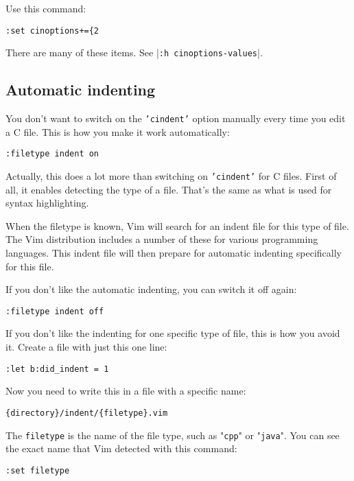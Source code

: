 {{Use this command:

\begin{Verbatim}[samepage=true]
 :set cinoptions+={2
\end{Verbatim}

There are many of these items.  See |\texttt{:h cinoptions-values}|.
\subsection{Automatic indenting}
You don't want to switch on the \texttt{'cindent'} option manually every time you edit a C file.
This is how you make it work automatically:

\begin{Verbatim}[samepage=true]
 :filetype indent on
\end{Verbatim}

Actually, this does a lot more than switching on \texttt{'cindent'} for C files.
First of all, it enables detecting the type of a file.
That's the same as what is used for syntax highlighting.

When the filetype is known, Vim will search for an indent file for this type of file.
The Vim distribution includes a number of these for various programming languages.
This indent file will then prepare for automatic indenting specifically for this file.

If you don't like the automatic indenting, you can switch it off again:

\begin{Verbatim}[samepage=true]
 :filetype indent off
\end{Verbatim}

If you don't like the indenting for one specific type of file, this is how you avoid it.
Create a file with just this one line:

\begin{Verbatim}[samepage=true]
 :let b:did_indent = 1
\end{Verbatim}

Now you need to write this in a file with a specific name:

\begin{Verbatim}[samepage=true]
    {directory}/indent/{filetype}.vim
\end{Verbatim}

The \texttt{{filetype}} is the name of the file type, such as "\texttt{cpp}" or "\texttt{java}".
You can see the exact name that Vim detected with this command:

\begin{Verbatim}[samepage=true]
 :set filetype
\end{Verbatim}

}}
